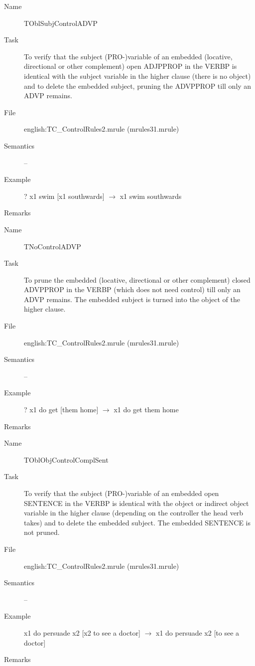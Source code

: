 \begin{description}
\vspace{1 cm}
\begin{description}
\item[Name] TOblSubjControlADVP
\item[Task] To verify that  the subject (PRO-)variable of an embedded 
(locative, directional or other complement) open ADJPPROP in the VERBP is 
identical with the subject variable in the higher clause (there is no object)
and to delete the embedded subject, pruning the ADVPPROP till only an ADVP
remains. 
\item[File] english:TC\_ControlRules2.mrule (mrules31.mrule)
\item[Semantics] --
\item[Example] ? x1 swim [x1 southwards] $\rightarrow$ x1 swim southwards
\item[Remarks] 
\end{description}

\vspace{1 cm}
\begin{description}
\item[Name]   TNoControlADVP
\item[Task] To prune the embedded (locative, directional or other complement) 
closed ADVPPROP in the VERBP (which does not need control) 
till only an ADVP remains. The embedded subject is turned into the object 
of the higher clause.
\item[File] english:TC\_ControlRules2.mrule (mrules31.mrule)
\item[Semantics] --
\item[Example] ? x1 do get [them home] $\rightarrow$ x1 do get them home
\item[Remarks] 
\end{description}

\vspace{1 cm}
\begin{description}
\item[Name] TOblObjControlComplSent
\item[Task] To verify that  the subject (PRO-)variable of an embedded 
open SENTENCE in the VERBP is identical with the object or indirect object 
variable in the higher clause (depending on the controller the head 
verb takes) and to delete the embedded subject. The embedded SENTENCE is not 
pruned.
\item[File] english:TC\_ControlRules2.mrule (mrules31.mrule)
\item[Semantics] --
\item[Example] x1 do persuade x2 [x2 to see a doctor] $\rightarrow$ x1 do 
persuade x2 [to see a doctor]
\item[Remarks] 
\end{description}


\end{description}
